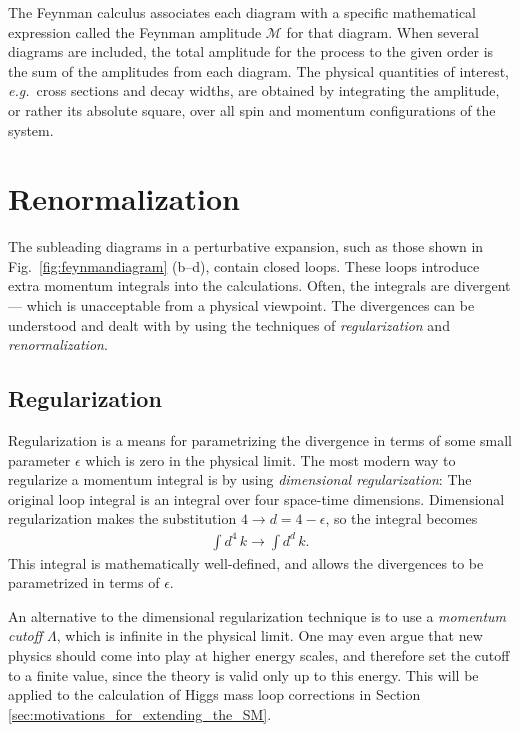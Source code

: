 \documentclass[twoside,english]{uiofysmaster}
\begin{document}
The Feynman calculus associates each diagram with a specific mathematical expression called the Feynman amplitude $\mathcal{M}$ for that diagram. When several diagrams are included, the total amplitude for the process to the given order is the sum of the amplitudes from each diagram. The physical quantities of interest, {\it e.g.}\ cross sections and decay widths, are obtained by integrating the amplitude, or rather its absolute square, over all spin and momentum configurations of the system.

\section{Renormalization}
\label{sec:renormalization}
The subleading diagrams in a perturbative expansion, such as those shown in Fig.\  \ref{fig:feynmandiagram} (b--d), contain closed loops. These loops introduce extra momentum integrals into the calculations. Often, the integrals are divergent --- which is unacceptable from a physical viewpoint. The divergences can be understood and dealt with by using the techniques of {\it regularization} and {\it renormalization}. 
\subsection{Regularization}
Regularization is a means for parametrizing the divergence in terms of some small parameter $\epsilon$ which is zero in the physical limit. The most modern way to regularize a momentum integral is by using {\it dimensional regularization}: The original loop integral is an integral over four space-time dimensions. Dimensional regularization makes the substitution $4 \to d = 4-\epsilon$, so the integral becomes
\begin{align}
	\int d^4 \, k \to \int d^d \, k.
\end{align}
This integral is mathematically well-defined, and allows the divergences to be parametrized in terms of $\epsilon$.

An alternative to the dimensional regularization technique is to use a {\it momentum cutoff} $\Lambda$, which is infinite in the physical limit. One may even argue that new physics should come into play at higher energy scales, and therefore set the cutoff to a finite value, since the theory is valid only up to this energy. This will be applied to the calculation of Higgs mass loop corrections in Section \ref{sec:motivations_for_extending_the_SM}.
\end{document}

